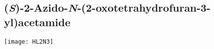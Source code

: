 
\subsection{(\textit{S})-2-Azido-\textit{N}-(2-oxotetrahydrofuran-3-yl)acetamide }


\begin{scheme}[H]
	\begin{center}
		\texttt{[image: HL2N3]}
	\end{center}
\end{scheme}

